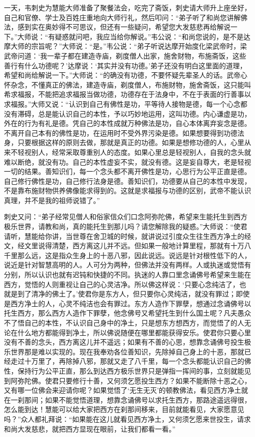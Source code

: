 \documentclass[12pt,twoside,openany]{book}
\newcommand{\kai}[1]{{\CJKfamily{kai}#1}}
\begin{document}
\kai{一天，韦刺史为慧能大师准备了聚餐法会，吃完了斋饭，刺史请大师升上座坐好，自己和官僚、学士及百姓庄重地向大师行礼，然后叩问：“弟子听了和尚您讲解佛法，感到实在奥妙得不可思议，但还有一些疑问，希望您大发慈悲再给解说一下。”大师说：“有疑惑就问吧，我应当给你解说。”韦公说：“和尚您说的，是不是达摩大师的宗旨呢？”大师说：“是。”韦公说：“弟子听说达摩开始度化梁武帝时，梁武帝问道：‘我一辈子都在建造寺庙，剃度僧人出家，施舍财物，布施斋饭，这些善行有什么功德呢？’达摩说：‘其实并没有功德。’弟子还没有明白这里面的道理，希望和尚给解说一下。”大师说：“的确没有功德，不要怀疑先辈圣人的话。武帝心怀杂念，不懂真正的佛法，建造寺庙，剃度僧人，布施财物，施舍斋饭，这只能叫希求福报，不能把追求福报当做功德，功德存在于法身中，不在于表面的行善事以求福报。”大师又说：“认识到自己有佛性是功，平等待人接物是德，每一个心念都没有滞碍，总是能认识自己的本性，予以巧妙地运用，这叫功德。内心谦虚是功，外在的行为有礼是德。凭自己的本性成就万种佛法是功，自心本体离弃妄念是德。不离开自己本有的佛性是功，在运用时不受外界污染是德。如果想要得到功德法身，只要根据这样的原则去做，那就是真正的功德。如果是想修功德的人，心里从来不轻视别人，经常采取尊重别人的态度。如果心里总是轻视别人，自我的念头就难以断绝，就没有功。自己的本性虚妄不实，就没有德。这是妄自尊大，老是轻视一切的结果。善知识们，每一个念头都不离开佛性是功，心思行为公平正直是德。自己修行佛性是功，自己修行法身是德。善知识们，功德要从自己的本性中发现，不是靠布施财物供养佛像能求得到的。这就是求福报与功德的区别，武帝不能认识真理，并不是我的祖师说错了。”
	
刺史又问：“弟子经常见僧人和俗家信众们口念阿弥陀佛，希望来生能托生到西方极乐世界，请教和尚，真的能托生到那儿吗？请您解除我的疑惑。”大师说：“使君请听，慧能给你讲，当世尊在舍卫城的时候，就讲说过引度众生往生西方净土的经文，经文里说得清楚，西方离这儿并不远。但如果一般地计算里程，那就有十万八千里那么远，这是指众生身上的十恶八邪，因此说远。说远是针对根性低下的人，说近是针对智慧高明的人。人可分为两种，但佛法并没有两样。人或执迷或觉悟有分别，所以认识也就有迟钝和快捷的不同。执迷的人靠口里念诵佛号希望来生能在西方，觉悟的人则重视让自己的心灵洁净。所以佛这样说：‘只要心念纯洁了，也就是到了清净的佛土了。’使君你是东方人，但只要你心灵纯洁，就没有罪过；即使是西方净土的人，心灵不纯洁也会有罪过。东方人造作下罪孽，想通过念诵佛号以托生西方，那么西方人造作下罪孽，他念佛号又希望托生到什么国土呢？凡夫愚众不了悟自己的本性，不认识自己身中的净土，只是想东方想西方，而觉悟了的人无论在什么地方都能得到净土，所以佛说随便在哪里都能获得安乐。使君你只要心里没有不善的念头，西方离这儿并不遥远；如果有不善的心思，想靠念诵佛号投生极乐世界那是难以实现的。现在我奉劝各位善知识，先除掉自己身上的十恶，那就已经走过十万里了，再除掉八邪，那就又走了八千里，每一个念头都能认识自己的佛性，保持行为公平正直，那么到达西方极乐世界只是弹指一挥间的事，立刻就能见到阿弥陀佛。使君只要修行十善，又何须乞愿投生西方？如果不能断除十恶之心，又有哪一位佛会来迎请你呢？如果觉悟了‘无生无灭’的顿教佛法，看见西方净土就在一刹那间；如果不能觉悟道理，想靠念诵佛号以求托生西方，那路途遥远得很，怎么能到达！慧能可以给大家把西方在刹那间移来，目前就能看见，大家愿意见吗？”众人都礼拜说：“如果能在这儿就看见西方净土，又何须乞愿来世投生，请求和尚大发慈悲，就把西方显现在眼前，让我们都看一看。”}
\end{document}
